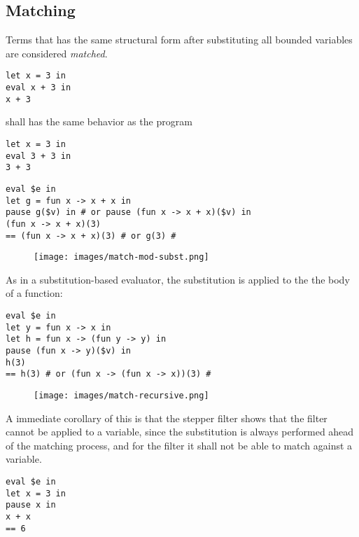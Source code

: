 


\subsection{Matching}

Terms that has the same structural form after substituting all bounded variables
are considered \emph{matched}.

\begin{verbatim}
let x = 3 in
eval x + 3 in
x + 3
\end{verbatim}
shall has the same behavior as the program
\begin{verbatim}
let x = 3 in
eval 3 + 3 in
3 + 3
\end{verbatim}

\begin{verbatim}
eval $e in
let g = fun x -> x + x in
pause g($v) in # or pause (fun x -> x + x)($v) in
(fun x -> x + x)(3)
== (fun x -> x + x)(3) # or g(3) #
\end{verbatim}

\begin{figure}[h]
  \texttt{[image: images/match-mod-subst.png]}
\end{figure}

As in a substitution-based evaluator, the substitution is applied to the
the body of a function:
\begin{verbatim}
eval $e in
let y = fun x -> x in
let h = fun x -> (fun y -> y) in
pause (fun x -> y)($v) in
h(3)
== h(3) # or (fun x -> (fun x -> x))(3) #
\end{verbatim}

\begin{figure}[h]
  \texttt{[image: images/match-recursive.png]}
\end{figure}

A immediate corollary of this is that the stepper filter shows that
the filter cannot be applied to a variable, since the substitution is always
performed ahead of the matching process, and for the filter it shall not be
able to match against a variable.

\begin{verbatim}
eval $e in
let x = 3 in
pause x in
x + x
== 6
\end{verbatim}


